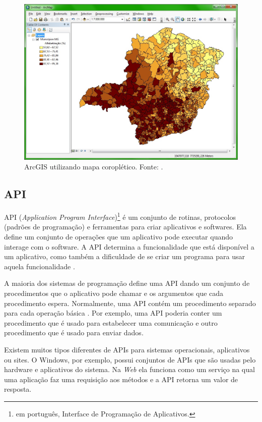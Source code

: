 \documentclass[12pt]{article}
\begin{document}
\begin{figure}[!h]
\centering
\includegraphics[scale=0.48]{ExemploArcGis.jpg}
\caption{ArcGIS utilizando mapa coroplético. Fonte: \citet{andersonm}.}
\label{arcgis}
\end{figure}

\subsection{API}

API (\emph{Application Program Interface})\footnote{em português, Interface de Programação de Aplicativos.} é um conjunto de rotinas, protocolos (padrões de programação) e ferramentas para criar aplicativos e softwares. Ela define um conjunto de operações que um aplicativo pode executar quando interage com o software. A API determina a funcionalidade que está disponível a um aplicativo, como também a dificuldade de se criar um programa para usar aquela funcionalidade \citep{redes}.

A maioria dos sistemas de programação define uma API dando um conjunto de procedimentos que o aplicativo pode chamar e os argumentos que cada procedimento espera. Normalmente, uma API contém um procedimento separado para cada operação básica \citep{redes}. Por exemplo, uma API poderia conter um procedimento que é usado para estabelecer uma comunicação e outro procedimento que é usado para enviar dados.

Existem muitos tipos diferentes de APIs para sistemas operacionais, aplicativos ou sites. O Windows, por exemplo, possui conjuntos de APIs que são usadas pelo hardware e aplicativos do sistema. Na \emph{Web} ela funciona como um serviço na qual uma aplicação faz uma requisição aos métodos e a API retorna um valor de resposta.
\end{document}
